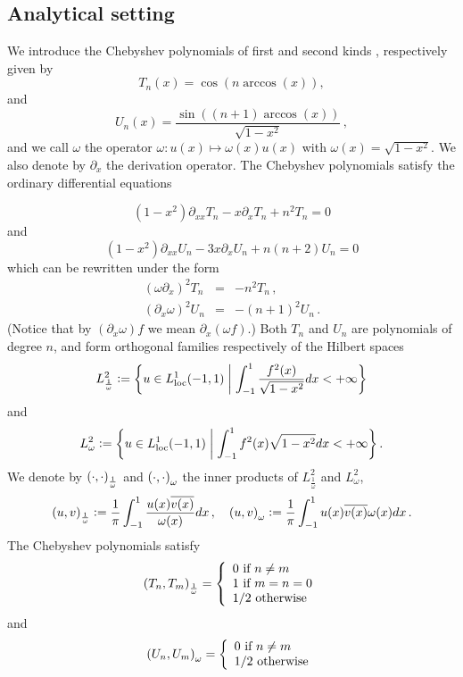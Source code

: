 \documentclass[a4paper]{subfiles}
\begin{document}
\subsection{Analytical setting}

We introduce the Chebyshev polynomials of first and second kinds \cite{mason2002chebyshev}, respectively given by 
\[T_n(x) = \cos(n \arccos(x)),\]
and 
\[U_n(x) = \dfrac{\sin((n+1) \arccos(x))}{\sqrt{1 - x^2}}\,,\]
and we call $\omega$ the operator $\omega:u(x) \mapsto \omega(x)u(x)$ with $\omega(x) = \sqrt{1 - x^2}$. We also denote by  
$\partial_x$ the derivation operator. The Chebyshev polynomials satisfy the ordinary differential equations

$$
	(1-x^2)\partial_{xx}T_n -x\partial_x T_n +n^2T_n =0
$$
and
$$
(1-x^2)\partial_{xx}U_n -3x\partial_xU_n +n(n+2)U_n =0
$$
which can be rewritten under the form
\begin{eqnarray}
	(\omega\partial_x)^2 T_n &=& -n^2T_n\,, \label{cheb1}\\
	(\partial_x\omega)^2 U_n &=& -(n+1)^2U_n\, .\label{cheb2}
\end{eqnarray}
(Notice that by $(\partial_x\omega) f$ we mean $\partial_x(\omega f)$.) Both $T_n$ and $U_n$ are polynomials of degree $n$, and 
form orthogonal families respectively of the Hilbert spaces 
$$L^2_{\frac{1}{\omega}} \mathrel{\mathop:}= \left\{u \in L^1_\textup{loc}(-1,1)\mathrel{}\middle|\mathrel{}\int_{-1}^{1} \dfrac{f^2(x)}{\sqrt{1 - x^2} }dx< + \infty\right\}$$
and 
$$L^2_{\omega} \mathrel{\mathop:}= \left\{u \in L^1_\textup{loc}(-1,1)\mathrel{}\middle|\mathrel{}\int_{-1}^{1} {f^2(x)}{\sqrt{1 - x^2} }dx< + \infty\right\}.$$
We denote by $\left( \cdot,\cdot\right)_\frac{1}{\omega}$ and $\left( \cdot,\cdot\right)_\omega$ the inner products of $L^2_{\frac{1}{\omega}}$ and $L^2_{\omega}$,
\[\left( u,v\right)_{\frac{1}{\omega}} \mathrel{\mathop:}= \frac{1}{\pi}\int_{-1}^{1} \frac{u(x) \overline{v(x)}}{\omega(x)}dx\,, \quad \left( u,v\right)_{\omega} \mathrel{\mathop:}= \frac{1}{\pi}\int_{-1}^{1} {u(x) \overline{v(x)}}{\omega(x)}dx\,.\]
The Chebyshev polynomials satisfy
\begin{equation}
	\left( T_n,T_m\right)_\frac{1}{\omega} = \left\{
	\begin{array}{l}
	0 \mbox{ if } n\ne m\\
	1 \mbox{ if } m=n=0\\
	1/2 \mbox{ otherwise}
	\end{array} 
	\right.
\end{equation}
	and
\begin{equation}
	\left( U_n,U_m\right)_{\omega} = \left\{
	\begin{array}{l}
	0 \mbox{ if } n\ne m\\
	1/2 \mbox{ otherwise}
	\end{array} 
	\right.
\end{equation}
\end{document}
